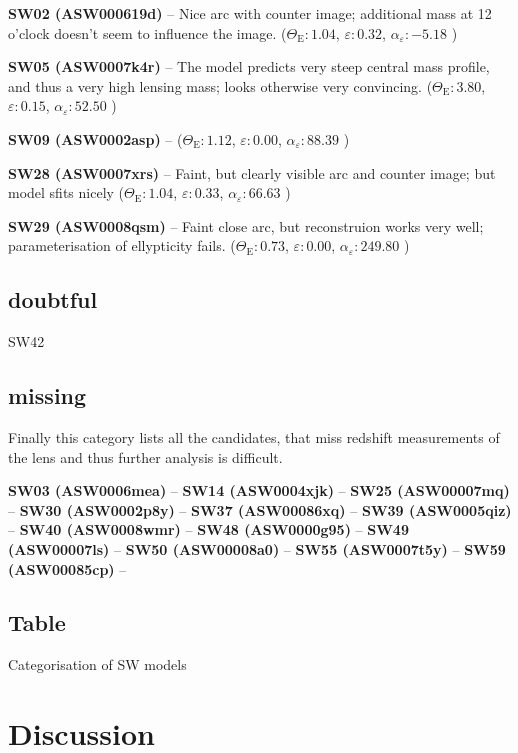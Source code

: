 \documentclass[fleqn,usenatbib]{mnras}
\newcommand{\lenstitle}[1]{\noindent\textbf{#1} --}
\newcommand{\params}[3]{(\(\Theta_\text{E}:#1\), $\varepsilon:#2$, $\alpha_\varepsilon:#3$ )}
\begin{document}
\lenstitle{SW02 (ASW000619d)}
Nice arc with counter image;
additional mass at 12 o'clock doesn't seem to influence the image.
\params{1.04}{0.32}{-5.18}

\lenstitle{SW05 (ASW0007k4r)}
The model predicts very steep central mass profile, and thus a very high lensing mass;
looks otherwise very convincing.
\params{3.80}{0.15}{52.50}
  
\lenstitle{SW09 (ASW0002asp)}
\params{1.12}{0.00}{88.39}
  
\lenstitle{SW28 (ASW0007xrs)}
Faint, but clearly visible arc and counter image;
but model sfits nicely
\params{1.04}{0.33}{66.63}
 
\lenstitle{SW29 (ASW0008qsm)}
Faint close arc, but reconstruion works very well;
parameterisation of ellypticity fails.
\params{0.73}{0.00}{249.80}


\subsection{doubtful}

SW42


\subsection{missing}

Finally this category lists all the candidates, that miss redshift measurements of the lens and thus further analysis is difficult.

\lenstitle{SW03 (ASW0006mea)}
\lenstitle{SW14 (ASW0004xjk)}
\lenstitle{SW25 (ASW00007mq)}
\lenstitle{SW30 (ASW0002p8y)}
\lenstitle{SW37 (ASW00086xq)}
\lenstitle{SW39 (ASW0005qiz)}
\lenstitle{SW40 (ASW0008wmr)}
\lenstitle{SW48 (ASW0000g95)}
\lenstitle{SW49 (ASW00007ls)}
\lenstitle{SW50 (ASW00008a0)}
\lenstitle{SW55 (ASW0007t5y)}
\lenstitle{SW59 (ASW00085cp)}


\subsection{Table}

\begin{table}
  \caption{Categorisation of SW models}
  \label{tab:models}
  
\end{table}



\section{Discussion}
\end{document}

